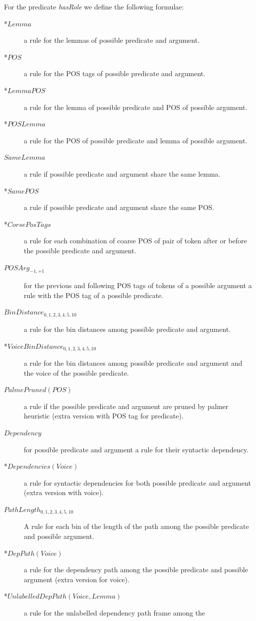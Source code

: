 For the predicate \emph{hasRole} we define the following formulae:
\begin{description}
    \item[*$Lemma$] a rule for the lemmas of possible predicate and argument.
    \item[*$POS$] a rule for the POS tags of possible predicate and argument.
    \item[*$LemmaPOS$] a rule for the lemma of possible predicate and POS of possible argument.
    \item[*$POSLemma$] a rule for the POS of possible predicate and lemma of possible argument.
    \item[$SameLemma$] a rule if possible predicate and argument share the same
        lemma.
    \item[*$SamePOS$] a rule if possible predicate and argument share the same
        POS.
    \item[*$CorsePosTags$] a rule for each combination of coarse POS of pair of token after or before the possible predicate and argument.
    \item[$POSArg_{-1,+1}$] for the previous and following POS tags of tokens of a possible argument
        a rule with the POS tag of a possible predicate.
    \item[$BinDistance_{0,1,2,3,4,5,10}$] a rule for the bin distances among possible predicate and argument.
    \item[*$VoiceBinDistance_{0,1,2,3,4,5,10}$] a rule for the bin distances among possible predicate and argument and the voice of the possible predicate.
    \item[$PalmePruned(POS)$] a rule if the possible predicate and argument are
        pruned by palmer heuristic (extra version with POS tag for predicate).
    \item[$Dependency$] for possible predicate and argument a rule for their
        syntactic dependency.
    \item[*$Dependencies(Voice)$] a rule for syntactic dependencies for both possible predicate and
        argument (extra version with voice).
    \item[$PathLength_{0,1,2,3,4,5,10}$] A rule for each bin of the length of the path among the possible predicate and possible
        argument.
    \item[*$DepPath(Voice)$] a rule for the dependency path among the
        possible predicate and possible argument (extra version for voice).
    \item[*$UnlabelledDepPath(Voice,Lemma)$] a rule for the unlabelled dependency path frame among the

\end{description}
